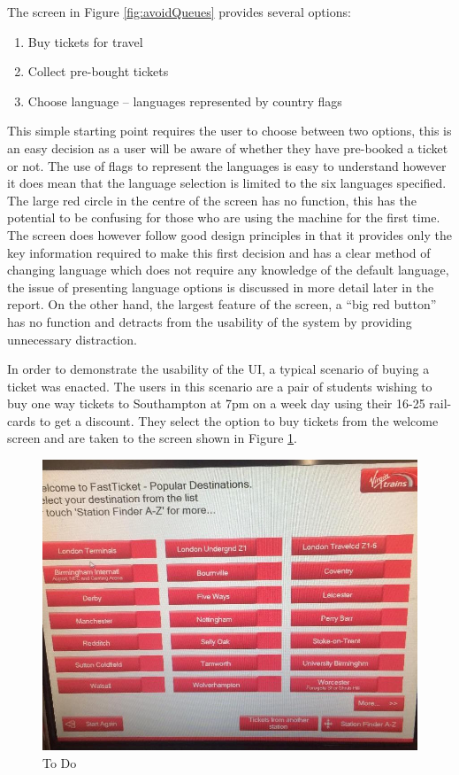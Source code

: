 The screen in Figure \ref{fig:avoidQueues} provides several options:
\begin{enumerate}
	\item Buy tickets for travel
	\item Collect pre-bought tickets
	\item Choose language – languages represented by country flags
\end{enumerate}

This simple starting point requires the user to choose between two options, this is an easy decision as a user will be aware of whether they have pre-booked a ticket or not. The use of flags to represent the languages is easy to understand however it does mean that the language selection is limited to the six languages specified. The large red circle in the centre of the screen has no function, this has the potential to be confusing for those who are using the machine for the first time. The screen does however follow good design principles in that it provides only the key information required to make this first decision and has a clear method of changing language which does not require any knowledge of the default language, the issue of presenting language options is discussed in more detail later in the report. On the other hand, the largest feature of the screen, a “big red button” has no function and detracts from the usability of the system by providing unnecessary distraction. 

In order to demonstrate the usability of the UI, a typical scenario of buying a ticket was enacted. The users in this scenario are a pair of students wishing to buy one way tickets to Southampton at 7pm on a week day using their 16-25 rail-cards to get a discount. They select the option to buy tickets from the welcome screen and are taken to the screen shown in Figure \ref{fig:destination}.

\begin{figure}[h]
	\centering
	\includegraphics[width=0.5\linewidth, angle=0, origin=c]{images/image06}
	\caption{To Do}
	\label{fig:destination}
\end{figure}

